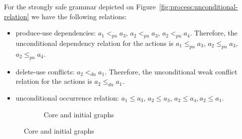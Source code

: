 \begin{example}  For the strongly safe grammar depicted on Figure~\ref{fig:process:unconditional-relation} we have the following relations: 

\begin{itemize}
  \item produce-use dependencies: $a_1 <_{pu} a_3$, $a_2 <_{pu} a_3$, $a_2 <_{pu} a_4$. Therefore, the unconditional dependency relation for the actions is $a_1 \leq_{pu} a_3$, $a_2 \leq_{pu} a_3$, $a_2 \leq_{pu} a_4$. 
  \item delete-use conflicts: $a_2 <_{du} a_1$. Therefore, the unconditional weak conflict relation for the actions is $a_2 \leq_{du} a_1$.
  \item unconditional occurrence relation: $a_1 \leq a_3$, $a_2 \leq a_3$, $a_2 \leq a_4, a_2 \leq a_1$.
\end{itemize}

\begin{figure}[!ht]
  \centering
  \begin{subfigure}[t]{.5\textwidth}
    \centerline{}
    \caption{Core and initial graphs}\label{fig:process:unconditional-relation:core-graph}
  \end{subfigure}


\end{figure}
\end{example}
